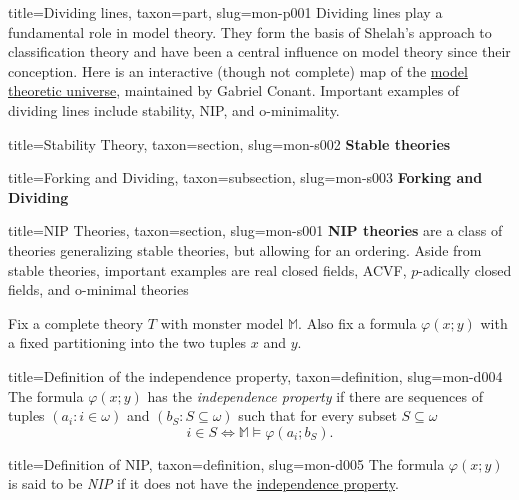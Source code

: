 \documentclass[a4paper]{article}
\begin{document}
  
  
\begin{tree}{title={Dividing lines}, taxon={part}, slug={mon-p001}}
Dividing lines play a fundamental role in model theory. They form the basis of Shelah's approach to classification theory and have been a central influence on model theory since their conception. Here is an interactive (though not complete) map of the \href{https://forkinganddividing.com}{model theoretic universe}, maintained by Gabriel Conant. Important examples of dividing lines include stability, NIP, and o-minimality.
  
  
\begin{tree}{title={Stability Theory}, taxon={section}, slug={mon-s002}}
\textbf{Stable theories}
\begin{tree}{title={Forking and Dividing}, taxon={subsection}, slug={mon-s003}}
\textbf{Forking and Dividing}
\end{tree}

\end{tree}


    
    
\begin{tree}{title={NIP Theories}, taxon={section}, slug={mon-s001}}
\textbf{NIP theories} are a class of theories generalizing stable
theories, but allowing for an ordering. Aside from stable theories,
important examples are real closed fields, ACVF, \(p\)-adically closed
fields, and o-minimal theories\par{Fix a complete theory \(T\) with monster model \(\mathbb {M}\).
Also fix a formula \(\varphi (x;y)\) with a fixed partitioning into
the two tuples \(x\) and \(y\).}
\begin{tree}{title={Definition of the independence property}, taxon={definition}, slug={mon-d004}}
The formula \(\varphi (x;y)\) has the \emph{independence property} if there
are sequences of tuples \((a_i : i  \in   \omega )\) and
\((b_S : S  \subseteq   \omega )\) such that for every subset \(S  \subseteq   \omega\)
\[i  \in  S  \Longleftrightarrow   \mathbb {M}  \models   \varphi (a_i; b_S).\]
\end{tree}

\begin{tree}{title={Definition of NIP}, taxon={definition}, slug={mon-d005}}
The formula \(\varphi (x;y)\) is said to be \emph{NIP} if it does not have
the \href{mon-0004}{independence property}.
\end{tree}


\end{tree}
\end{tree}
\end{document}

